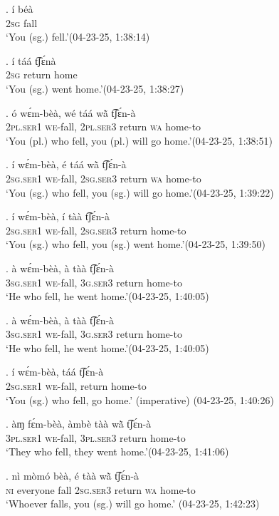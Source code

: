 \documentclass{assets/fieldnotes}
\begin{document}
\exg. í béà\\
\textsc{2sg} fall\\
`You (sg.) fell.’\hfill{(04-23-25, 1:38:14)}

\exg. í táá t͡ʃɛ́nà\\
\textsc{2sg} return home\\
`You (sg.) went home.’\hfill{(04-23-25, 1:38:27)}

\exg. ó wɛ́m-bèà, wé táá wã̀ t͡ʃɛ́n-à\\
\textsc{2pl.ser1} \textsc{we}-fall, \textsc{2pl.ser3} return \textsc{wa} home-to\\
`You (pl.) who fell, you (pl.) will go home.’\hfill{(04-23-25, 1:38:51)}\label{you_who_fell}

\exg. í wɛ́m-bèà, é táá wã̀ t͡ʃɛ́n-à\\
\textsc{2sg.ser1} \textsc{we}-fall, \textsc{2sg.ser3} return \textsc{wa} home-to\\
`You (sg.) who fell, you (sg.) will go home.’\hfill{(04-23-25, 1:39:22)}

\exg. í wɛ́m-bèà, í tàà t͡ʃɛ́n-à\\
\textsc{2sg.ser1} \textsc{we}-fall, \textsc{2sg.ser3} return home-to\\
`You (sg.) who fell, you (sg.) went home.’\hfill{(04-23-25, 1:39:50)}

\exg. à wɛ́m-bèà, à tàà t͡ʃɛ́n-à\\
\textsc{3sg.ser1} \textsc{we}-fall, \textsc{3g.ser3} return home-to\\
`He who fell, he went home.’\hfill{(04-23-25, 1:40:05)}

\exg. à wɛ́m-bèà, à tàà t͡ʃɛ́n-à\\
\textsc{3sg.ser1} \textsc{we}-fall, \textsc{3g.ser3} return home-to\\
`He who fell, he went home.’\hfill{(04-23-25, 1:40:05)}

\exg. í wɛ́m-bèà, táá t͡ʃɛ́n-à\\
\textsc{2sg.ser1} \textsc{we}-fall, return home-to\\
`You (sg.) who fell, go home.’ (imperative) \hfill{(04-23-25, 1:40:26)}

\exg. àɱ fɛ́m-bèà, àmbè tàà wã̀ t͡ʃɛ́n-à\\
\textsc{3pl.ser1} \textsc{we}-fall, \textsc{3pl.ser3} return home-to\\
`They who fell, they went home.’\hfill{(04-23-25, 1:41:06)}

\noindent{\rule{\textwidth}{1pt}}

\exg. nì mòmó bèà, é tàà wã̀ t͡ʃɛ́n-à\\
\textsc{ni} everyone fall \textsc{2sg.ser3} return \textsc{wa} home-to\\
`Whoever falls, you (sg.) will go home.’ \hfill{(04-23-25, 1:42:23)}
\end{document}
